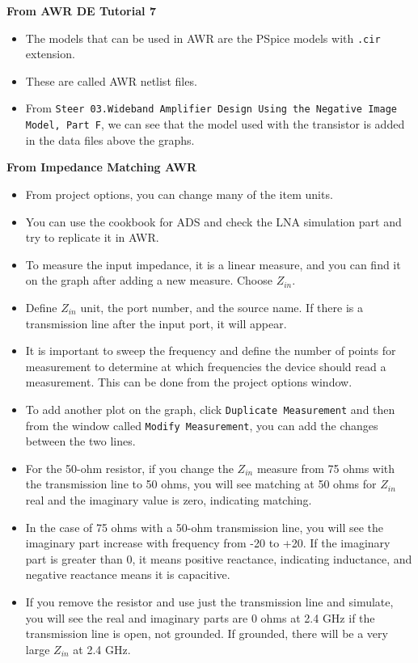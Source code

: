 \documentclass[english]{article}
\begin{document}
\textbf{From AWR DE Tutorial 7}
\begin{itemize}
    \item The models that can be used in AWR are the PSpice models with \texttt{.cir} extension.
    \item These are called AWR netlist files.
    \item From \texttt{Steer 03.Wideband Amplifier Design Using the Negative Image Model, Part F}, we can see that the model used with the transistor is added in the data files above the graphs.
\end{itemize}

\textbf{From Impedance Matching AWR}
\begin{itemize}
    \item From project options, you can change many of the item units.
    \item You can use the cookbook for ADS and check the LNA simulation part and try to replicate it in AWR.
    \item To measure the input impedance, it is a linear measure, and you can find it on the graph after adding a new measure. Choose \( Z_{in} \).
    \item Define \( Z_{in} \) unit, the port number, and the source name. If there is a transmission line after the input port, it will appear.
    \item It is important to sweep the frequency and define the number of points for measurement to determine at which frequencies the device should read a measurement. This can be done from the project options window.
    \item To add another plot on the graph, click \texttt{Duplicate Measurement} and then from the window called \texttt{Modify Measurement}, you can add the changes between the two lines.
    \item For the 50-ohm resistor, if you change the \( Z_{in} \) measure from 75 ohms with the transmission line to 50 ohms, you will see matching at 50 ohms for \( Z_{in} \) real and the imaginary value is zero, indicating matching.
    \item In the case of 75 ohms with a 50-ohm transmission line, you will see the imaginary part increase with frequency from -20 to +20. If the imaginary part is greater than 0, it means positive reactance, indicating inductance, and negative reactance means it is capacitive.
    \item If you remove the resistor and use just the transmission line and simulate, you will see the real and imaginary parts are 0 ohms at 2.4 GHz if the transmission line is open, not grounded. If grounded, there will be a very large \( Z_{in} \) at 2.4 GHz.

\end{itemize}
\end{document}
